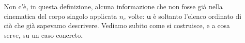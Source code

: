 Non c'è, in questa definizione, alcuna informazione che non fosse già
nella cinematica del corpo singolo applicata $n_c$ volte: $\bm{u}$ è
soltanto l'elenco ordinato di ciò che già sapevamo descrivere. Vediamo
subito come si costruisce, e a cosa serve, su un caso concreto.
%
%
%
%
%
